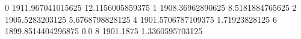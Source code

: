 0 1911.967041015625 12.1156005859375
1 1908.36962890625 8.5181884765625
2 1905.5283203125 5.6768798828125
4 1901.5706787109375 1.71923828125
6 1899.8514404296875 0.0
8 1901.1875 1.3360595703125
